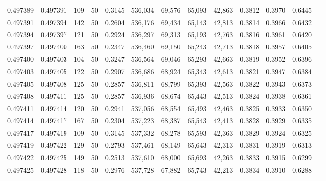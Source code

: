 \begin{tabular}{rrrrrrrrrrrrr}
0.497389 & 0.497391 &   109 &  50 &                                     0.3145 & 536,034 &  69,576 &  65,093 &  42,863 & 0.3812 & 0.3970 & 0.6445 \\
0.497391 & 0.497394 &   142 &  50 &                                     0.2604 & 536,176 &  69,434 &  65,143 &  42,813 & 0.3814 & 0.3966 & 0.6432 \\
0.497394 & 0.497397 &   121 &  50 &                                     0.2924 & 536,297 &  69,313 &  65,193 &  42,763 & 0.3816 & 0.3961 & 0.6420 \\
0.497397 & 0.497400 &   163 &  50 &                                     0.2347 & 536,460 &  69,150 &  65,243 &  42,713 & 0.3818 & 0.3957 & 0.6405 \\
0.497400 & 0.497403 &   104 &  50 &                                     0.3247 & 536,564 &  69,046 &  65,293 &  42,663 & 0.3819 & 0.3952 & 0.6396 \\
0.497403 & 0.497405 &   122 &  50 &                                     0.2907 & 536,686 &  68,924 &  65,343 &  42,613 & 0.3821 & 0.3947 & 0.6384 \\
0.497405 & 0.497408 &   125 &  50 &                                     0.2857 & 536,811 &  68,799 &  65,393 &  42,563 & 0.3822 & 0.3943 & 0.6373 \\
0.497408 & 0.497411 &   125 &  50 &                                     0.2857 & 536,936 &  68,674 &  65,443 &  42,513 & 0.3824 & 0.3938 & 0.6361 \\
0.497411 & 0.497414 &   120 &  50 &                                     0.2941 & 537,056 &  68,554 &  65,493 &  42,463 & 0.3825 & 0.3933 & 0.6350 \\
0.497414 & 0.497417 &   167 &  50 &                                     0.2304 & 537,223 &  68,387 &  65,543 &  42,413 & 0.3828 & 0.3929 & 0.6335 \\
0.497417 & 0.497419 &   109 &  50 &                                     0.3145 & 537,332 &  68,278 &  65,593 &  42,363 & 0.3829 & 0.3924 & 0.6325 \\
0.497419 & 0.497422 &   129 &  50 &                                     0.2793 & 537,461 &  68,149 &  65,643 &  42,313 & 0.3831 & 0.3919 & 0.6313 \\
0.497422 & 0.497425 &   149 &  50 &                                     0.2513 & 537,610 &  68,000 &  65,693 &  42,263 & 0.3833 & 0.3915 & 0.6299 \\
0.497425 & 0.497428 &   118 &  50 &                                     0.2976 & 537,728 &  67,882 &  65,743 &  42,213 & 0.3834 & 0.3910 & 0.6288 \\

\end{tabular}
